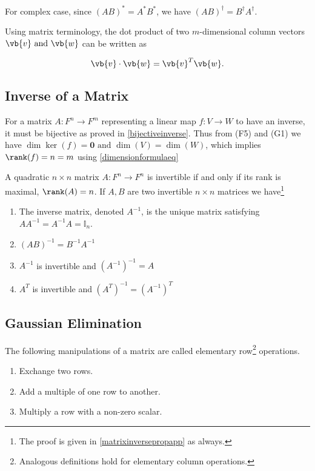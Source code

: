\documentclass[a4paper,12pt]{report}
\begin{document}
For complex case, since \((AB)^* = A^*B^*\), we have \((AB)^{\dagger} = B^{\dagger} A^{\dagger}\). 

Using matrix terminology, the dot product of two \(m\)-dimensional column vectors \(\vb{v} \text { and } \vb{w} \) can be written as 

\begin{equation}
    \vb{v} \cdot \vb{w} = \vb{v} ^{T} \vb{w}.
\end{equation}

\subsection{Inverse of a Matrix}

For a matrix \(A: F^{n} \rightarrow F^{m}  \) representing a linear map \(f: V \rightarrow W\)  to have an inverse, it must be bijective as proved in \cref{bijectiveinverse}. Thus from (F5) and (G1) we have \(\dim \ker (f) = \boldsymbol{0} \text { and } \dim (V) = \dim (W)\), which implies \(\rank (f) = n = m\) using \cref{dimensionformulaeq} 

\begin{lemma} \label{matrixinverseprop} 
A quadratic \(n \times n\) matrix \(A:F^{n}\rightarrow F^{n}  \) is invertible if and only if its rank is maximal, \ie \(\rank (A) = n\). If \(A, B\) are two invertible \(n\times n\) matrices we have\footnote{The proof is given in \cref{matrixinversepropapp} as always.} 

\begin{enumerate}[label=(H\arabic*)]
    \item The inverse matrix, denoted \(A^{-1} \), is the unique matrix satisfying \(AA^{-1} = A^{-1} A = \mathbb{I}_{n} \).
    \item \((AB)^{-1} = B^{-1} A^{-1} \)
    \item \(A^{-1} \) is invertible and \((A^{-1} )^{-1} = A\)
    \item \(A^{T} \) is invertible and \((A^{T} ) ^{-1} = (A^{-1} )^{T} \)       
\end{enumerate}

\end{lemma}


\subsection{Gaussian Elimination}

\begin{definition}
The following manipulations of a matrix are called elementary row\footnote{Analogous definitions hold for elementary column operations.} operations.

\begin{enumerate}[label=(I\arabic*)]
    \item Exchange two rows.
    \item Add a multiple of one row to another.
    \item Multiply a row with a non-zero scalar.
\end{enumerate}

\end{definition}
\end{document}
